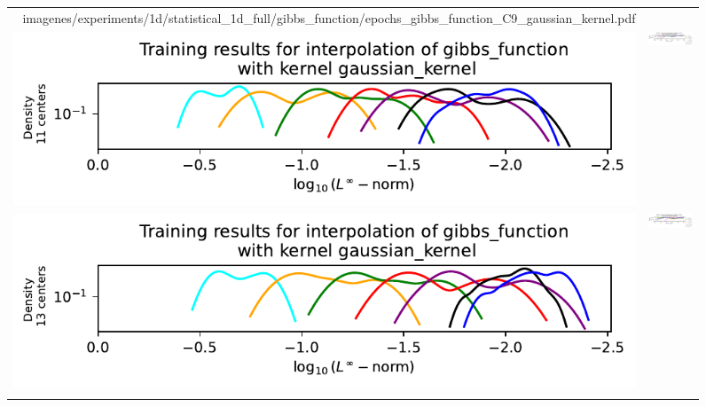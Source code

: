 \documentclass[12pt]{report} %
\begin{document}
\begin{figure}[H]
\begin{tabular}{rl}
{        {imagenes/experiments/1d/statistical_1d_full/gibbs_function/epochs_gibbs_function_C9_gaussian_kernel.pdf}}
    \\
    {\includegraphics[width=.68\textwidth, trim={.58cm 1.25cm 0 1.17cm},clip=true]
    {imagenes/experiments/1d/statistical_1d_full/gibbs_function/linf_gibbs_function_C11_gaussian_kernel.pdf}} & {\includegraphics[width=.62\textwidth, trim={1cm 2.4cm 2.88cm 1.17cm},clip=true]
    {imagenes/experiments/1d/statistical_1d_full/gibbs_function/epochs_gibbs_function_C11_gaussian_kernel.pdf}}                                                                                     \\
    {\includegraphics[width=.68\textwidth, trim={.58cm 1.25cm 0 1.17cm},clip=true]
    {imagenes/experiments/1d/statistical_1d_full/gibbs_function/linf_gibbs_function_C13_gaussian_kernel.pdf}} & {\includegraphics[width=.62\textwidth, trim={1cm 2.4cm 2.88cm 1.17cm},clip=true]
        {imagenes/experiments/1d/statistical_1d_full/gibbs_function/epochs_gibbs_function_C13_gaussian_kernel.pdf}}
    \\
    {\includegraphics[width=.68\textwidth, trim={.58cm 0.2cm 0 1.17cm},clip=true]
}
\end{tabular}
\end{figure}
\end{document}
